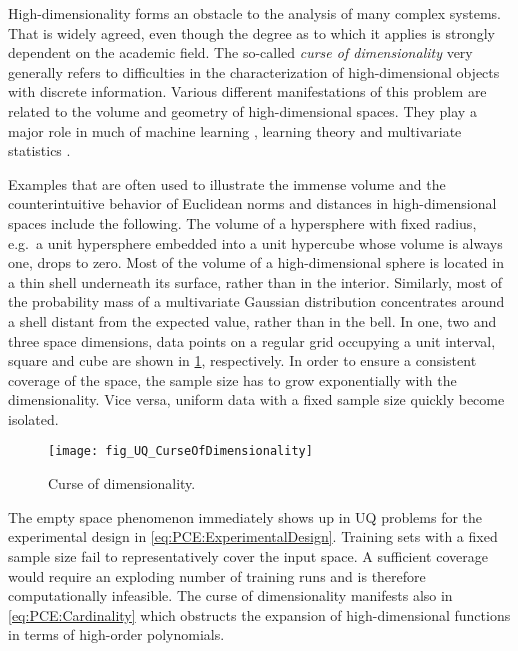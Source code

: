 High-dimensionality forms an obstacle to the analysis of many complex systems.
That is widely agreed, even though the degree as to which it applies is strongly dependent on the academic field.
The so-called \emph{curse of dimensionality} \cite{Optim:Bellman1957,Optim:Bellman1961} very generally
refers to difficulties in the characterization of high-dimensional objects with discrete information.
Various different manifestations of this problem are related to the volume and geometry of high-dimensional spaces.
They play a major role in much of machine learning \cite{ML:Bishop2006,ML:Murphy2012}, learning theory \cite{Statistics:Kulkarni2011,Statistics:James2013}
and multivariate statistics \cite{Statistics:Izenman2008,Statistics:Koch2014}.
\par %
Examples that are often used to illustrate the immense volume and the counterintuitive behavior of Euclidean norms and distances in high-dimensional spaces include the following.
The volume of a hypersphere with fixed radius, e.g.\ a unit hypersphere embedded into a unit hypercube whose volume is always one, drops to zero.
Most of the volume of a high-dimensional sphere is located in a thin shell underneath its surface, rather than in the interior.
Similarly, most of the probability mass of a multivariate Gaussian distribution concentrates around a shell distant from the expected value, rather than in the bell.
In one, two and three space dimensions, data points on a regular grid occupying a unit interval, square and cube are shown in \cref{fig:UQ:CurseOfDimensionality}, respectively.
In order to ensure a consistent coverage of the space, the sample size has to grow exponentially with the dimensionality.
Vice versa, uniform data with a fixed sample size quickly become isolated.
\begin{figure}[htbp]
  \centering
  \texttt{[image: fig\_UQ\_CurseOfDimensionality]}
  \caption[Curse of dimensionality]{Curse of dimensionality.}
  \label{fig:UQ:CurseOfDimensionality}
\end{figure}
\par %
The empty space phenomenon immediately shows up in UQ problems for the experimental design in \cref{eq:PCE:ExperimentalDesign}.
Training sets with a fixed sample size fail to representatively cover the input space.
A sufficient coverage would require an exploding number of training runs and is therefore computationally infeasible.
The curse of dimensionality manifests also in \cref{eq:PCE:Cardinality} which obstructs the expansion of high-dimensional functions in terms of high-order polynomials.
